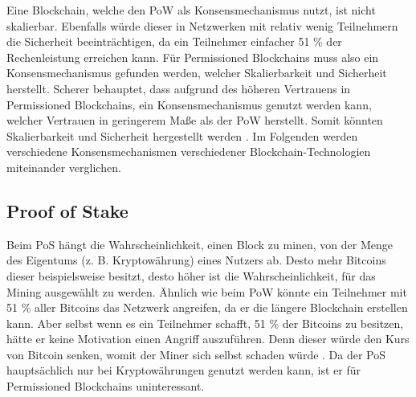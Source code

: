 Eine Blockchain, welche den \acs{PoW} als Konsensmechanismus nutzt, ist nicht skalierbar. Ebenfalls würde dieser in Netzwerken mit relativ wenig Teilnehmern die Sicherheit beeinträchtigen, da ein Teilnehmer einfacher 51 \% der Rechenleistung erreichen kann. Für Permissioned Blockchains muss also ein Konsensmechanismus gefunden werden, welcher Skalierbarkeit und Sicherheit herstellt. Scherer behauptet, dass aufgrund des höheren Vertrauens in Permissioned Blockchains, ein Konsensmechanismus genutzt werden kann, welcher Vertrauen in geringerem Maße als der \acs{PoW} herstellt. Somit könnten Skalierbarkeit und Sicherheit hergestellt werden \cite{SchererPerformanceScalabilityBlockchain2017}. Im Folgenden werden verschiedene Konsensmechanismen verschiedener Blockchain-Technologien miteinander verglichen.

\subsection{Proof of Stake}
Beim PoS hängt die Wahrscheinlichkeit, einen Block zu minen, von der Menge des Eigentums (z. B. Kryptowährung) eines Nutzers ab. Desto mehr Bitcoins dieser beispielsweise besitzt, desto höher ist die Wahrscheinlichkeit, für das Mining ausgewählt zu werden. Ähnlich wie beim \acs{PoW} könnte ein Teilnehmer mit 51 \% aller Bitcoins das Netzwerk angreifen, da er die längere Blockchain erstellen kann. Aber selbst wenn es ein Teilnehmer schafft, 51 \% der Bitcoins zu besitzen, hätte er keine Motivation einen Angriff auszuführen. Denn dieser würde den Kurs von Bitcoin senken, womit der Miner sich selbst schaden würde \cite{ZhengBlockchainChallengesOpportunities2017}. Da der PoS hauptsächlich nur bei Kryptowährungen genutzt werden kann, ist er für Permissioned Blockchains uninteressant.

